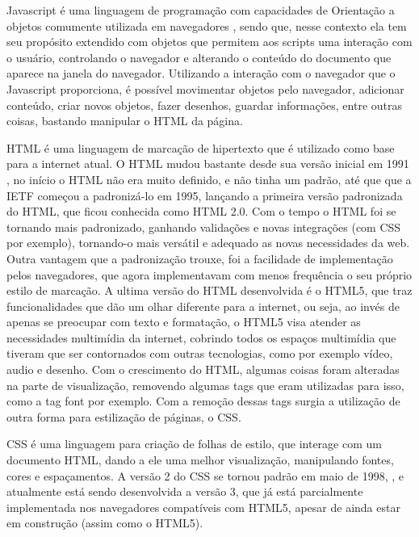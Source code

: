 Javascript é uma linguagem de programação com capacidades de Orientação a objetos comumente utilizada em
navegadores \cite{flanagan2006javascript}, sendo que, nesse contexto ela tem seu propósito extendido com objetos que permitem
aos scripts uma interação com o usuário, controlando o navegador e alterando o conteúdo
do documento que aparece na janela do navegador.
Utilizando a interação com o navegador que o Javascript proporciona, é possível movimentar
objetos pelo navegador, adicionar conteúdo, criar novos objetos, fazer desenhos, guardar
informações, entre outras coisas, bastando manipular o HTML da página.

HTML é uma linguagem de marcação de hipertexto que é utilizado como base para a internet
atual. O HTML mudou bastante desde sua versão inicial em 1991
\cite{powell2003html}, no início o HTML não era muito definido, e não tinha um padrão, até que que a
IETF começou a padronizá-lo em 1995, lançando a
primeira versão padronizada do HTML, que ficou conhecida como HTML 2.0.
Com o tempo o HTML foi se tornando mais padronizado, ganhando validações e novas integrações
(com CSS por exemplo), tornando-o mais versátil e adequado as novas necessidades da
web. Outra vantagem que a padronização trouxe, foi a facilidade de implementação pelos
navegadores, que agora implementavam com menos frequência o seu próprio estilo de marcação.
A ultima versão do HTML desenvolvida é o HTML5, que traz funcionalidades que dão um
olhar diferente para a internet, ou seja, ao invés de apenas se preocupar com texto
e formatação, o HTML5 visa atender as necessidades multimídia da internet, cobrindo
todos os espaços multimídia que tiveram que ser contornados com outras tecnologias,
como por exemplo vídeo, audio e desenho.
Com o crescimento do HTML, algumas coisas foram alteradas na parte de visualização,
removendo algumas tags que eram utilizadas para isso, como a tag font por exemplo.
Com a remoção dessas tags surgia a utilização de outra forma para
estilização de páginas, o CSS.

CSS é uma linguagem para criação de folhas de estilo, que interage com um documento
HTML, dando a ele uma melhor visualização, manipulando fontes, cores e espaçamentos.
A versão 2 do CSS se tornou padrão em maio de 1998, \cite{zeldman2009designing},
e atualmente está sendo desenvolvida a versão 3, que já está parcialmente implementada
nos navegadores compatíveis com HTML5, apesar de ainda estar em construção (assim como o HTML5).

